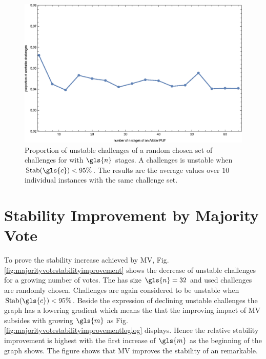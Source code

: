 \begin{figure}[ht]
\includegraphics[width=1.00\textwidth]{images/stages-stab-simulation.eps}
\caption[Proportion of unstable challenges of an \apuf]{Proportion of unstable challenges of a random chosen set of challenges for \apufs with $\gls{n}$ stages. 
A challenges is unstable when $\Stab(\gls{c}) < 95 \%$. 
The results are the average values over $10$ individual \puf instances with the same challenge set.} 
\label{fig:arbiterstabilities}
\end{figure}


\section{Stability Improvement by Majority Vote}
\label{sec:stabilityimprovementbymajorityvote}

To prove the stability increase achieved by \ac{MV}, Fig. \ref{fig:majorityvotestabilityimprovement} shows the decrease of unstable challenges for a growing number of votes.
The \mpuf has size $\gls{n} = 32$ and used challenges are randomly chosen.
Challenges are again considered to be unstable when $\Stab(\gls{c}) < 95 \%$.
Beside the expression of declining unstable challenges the graph has a lowering gradient which means the that the improving impact of \ac{MV} subsides with growing $\gls{m}$ as Fig. \ref{fig:majorityvotestabilityimprovementloglog} displays.
Hence the relative stability improvement is highest with the first increase of $\gls{m}$ as the beginning of the graph shows.
The figure shows that \ac{MV} improves the stability of an \apuf remarkable. 

